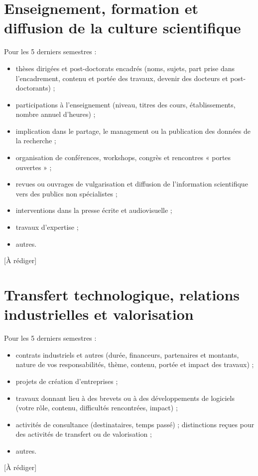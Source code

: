 \documentclass[10pt,a4paper]{article}
\newcommand{\arediger}{\textcolor{gris}{[À rédiger]}}
\begin{document}
\section{Enseignement, formation et diffusion de la culture scientifique}
\begin{consigne}
Pour les 5 derniers semestres :
\begin{itemize}
  \item thèses dirigées et post-doctorats encadrés (noms, sujets, part prise dans l'encadrement, contenu et portée des travaux, devenir des docteurs et post-doctorants) ;
  \item participations à l'enseignement (niveau, titres des cours, établissements, nombre annuel d'heures) ;
  \item implication dans le partage, le management ou la publication des données de la recherche ;
  \item organisation de conférences, workshops, congrès et rencontres « portes ouvertes » ;
  \item revues ou ouvrages de vulgarisation et diffusion de l'information scientifique vers des publics non spécialistes ;
  \item interventions dans la presse écrite et audiovisuelle ;
  \item travaux d'expertise ;
  \item autres.
\end{itemize}
\end{consigne}
\arediger %

\section{Transfert technologique, relations industrielles et valorisation}
\begin{consigne}
Pour les 5 derniers semestres :
\begin{itemize}
  \item contrats industriels et autres (durée, financeurs, partenaires et montants, nature de vos responsabilités, thème, contenu, portée et impact des travaux) ;
  \item projets de création d'entreprises ;
  \item travaux donnant lieu à des brevets ou à des développements de logiciels (votre rôle, contenu, difficultés rencontrées, impact) ;
  \item activités de consultance (destinataires, temps passé) ; distinctions reçues pour des activités de transfert ou de valorisation ;
  \item autres.
\end{itemize}
\end{consigne}
\arediger %
\end{document}
